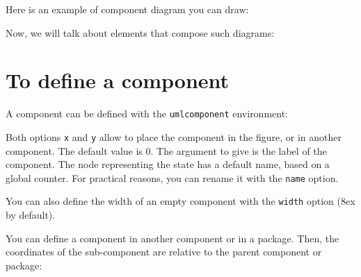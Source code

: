 \documentclass[a4paper,11pt]{report}
\begin{document}
Here is an example of component diagram you can draw:

\begin{center}
\end{center}

Now, we will talk about elements that compose such diagrams:

\section{To define a component}


A component can be defined with the {\tt umlcomponent} environment:

\medskip

\begin{minipage}{0.51\textwidth}
	
\end{minipage}
\begin{minipage}{0.49\textwidth}
	\begin{center}
	\end{center}
\end{minipage}

\medskip

Both options {\tt x} and {\tt y} allow to place the component in the figure, or in another component. The default value is 0.
The argument to give is the label of the component. The node representing the state has a default name, based on a global counter. For practical reasons, you can rename it with the {\tt name} option.

\medskip

You can also define the width of an empty component with the {\tt width} option (8ex by default).

\medskip

You can define a component in another component or in a package. Then, the coordinates of the sub-component are relative to the parent component or package:

\medskip

\begin{minipage}{0.51\textwidth}
	
\end{minipage}
\begin{minipage}{0.49\textwidth}
	\begin{center}
	\end{center}
\end{minipage}
\end{document}
